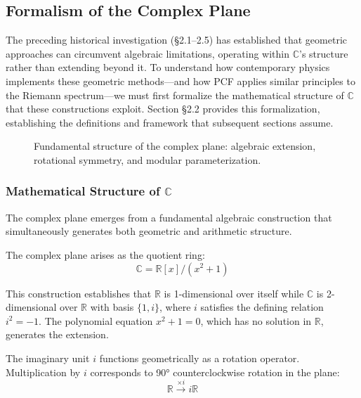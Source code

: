     \subsection{Formalism of the Complex Plane} \label{sec:complex-plane}

    The preceding historical investigation (\S 2.1--2.5) has established that geometric approaches can circumvent algebraic limitations, operating within $\mathbb{C}$'s structure rather than extending beyond it. To understand how contemporary physics implements these geometric methods—and how PCF applies similar principles to the Riemann spectrum—we must first formalize the mathematical structure of $\mathbb{C}$ that these constructions exploit. Section \S 2.2 provides this formalization, establishing the definitions and framework that subsequent sections assume.

    \begin{figure}[htbp]
        \centering
        \caption{Fundamental structure of the complex plane: algebraic extension, rotational symmetry, and modular parameterization.}
    \end{figure}

    \subsubsection{Mathematical Structure of $\mathbb{C}$}

    The complex plane emerges from a fundamental algebraic construction that simultaneously generates both geometric and arithmetic structure.

    \begin{Proposition} \label{prop:extension-by-root}
    The complex plane arises as the quotient ring:
    \[
    \mathbb{C} = \mathbb{R}[x]/(x^2+1)
    \]
    \end{Proposition}

    This construction establishes that $\mathbb{R}$ is 1-dimensional over itself while $\mathbb{C}$ is 2-dimensional over $\mathbb{R}$ with basis $\{1, i\}$, where $i$ satisfies the defining relation $i^2 = -1$. The polynomial equation $x^2+1=0$, which has no solution in $\mathbb{R}$, generates the extension.

    The imaginary unit $i$ functions geometrically as a rotation operator. Multiplication by $i$ corresponds to 90° counterclockwise rotation in the plane:
    \[
        \mathbb{R} \xrightarrow{\times i} i\mathbb{R}
    \]

